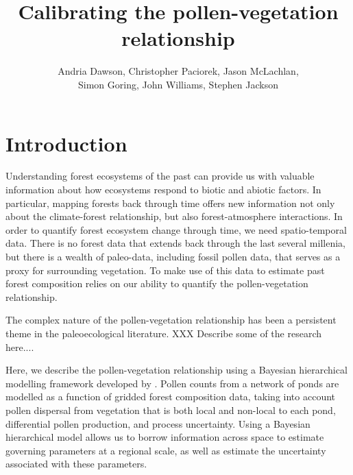 \documentclass[12pt]{article}
\begin{document}
\nocite{*}

\title{Calibrating the pollen-vegetation relationship}

\author{Andria Dawson, Christopher Paciorek, Jason McLachlan,\\ Simon Goring, John Williams, Stephen Jackson}

\maketitle

\section{Introduction}

Understanding forest ecosystems of the past can provide us with
valuable information about how ecosystems respond to biotic and
abiotic factors. In particular, mapping forests back through time
offers new information not only about the climate-forest relationship,
but also forest-atmosphere interactions. In order to quantify forest
ecosystem change through time, we need spatio-temporal data. There is
no forest data that extends back through the last several millenia,
but there is a wealth of paleo-data, including fossil pollen data,
that serves as a proxy for surrounding vegetation. To make use of this
data to estimate past forest composition relies on our ability to
quantify the pollen-vegetation relationship. 

The complex nature of the pollen-vegetation relationship has been a
persistent theme in the paleoecological literature.
XXX Describe some of the research here....

Here, we describe the pollen-vegetation relationship using a Bayesian
hierarchical modelling framework developed by
\citet{paciorek2009mapping}. Pollen counts from a network of ponds are
modelled as a function of gridded forest composition data, taking into
account pollen dispersal from vegetation that is both local and
non-local to each pond, differential pollen production, and process
uncertainty. Using a Bayesian hierarchical model allows us to borrow
information across space to estimate governing parameters at a
regional scale, as well as estimate the uncertainty associated with
these parameters.
\end{document}
